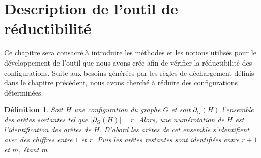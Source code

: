 \documentclass[10pt,a4paper]{article}
\newtheorem{definition}{Définition}
\begin{document}

\section{Description de l'outil de réductibilité}
\label{chap:Des}

Ce chapitre sera consacré à introduire les méthodes et les notions utilisés pour le développement de l'outil que nous avons crée afin de vérifier la réductibilité des configurations. Suite aux besoins générées par les règles de déchargement définis dans le chapitre précédent, nous avons cherché à réduire des configurations déterminées.



\begin{definition}
Soit $H$ une configuration du graphe $G$ et soit $\partial_G(H)$ l'ensemble des arêtes sortantes tel que $|\partial_G(H)|=r$. Alors, une \emph{numérotation} de $H$ est l'identification des arêtes de $H$. D'abord les arêtes de cet ensemble s'identifient avec des chiffres  entre $1$ et $r$. Puis les arêtes restantes sont identifiées entre $r+1$ et $m$, étant $m$
\end{definition}
\end{document}
